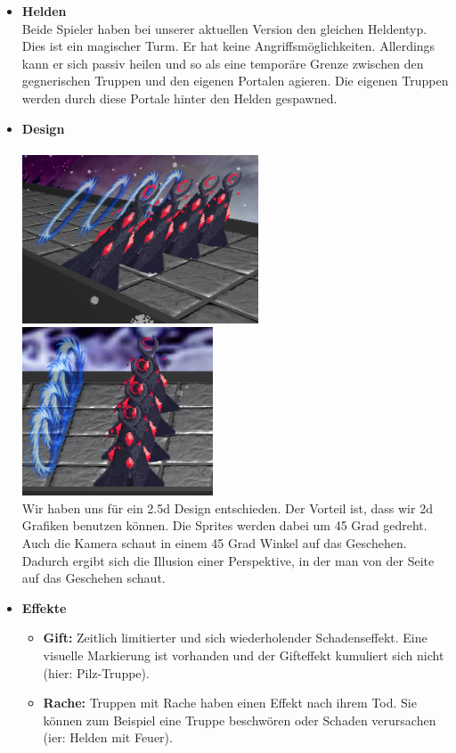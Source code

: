 \begin{itemize}
    \item \textbf{Helden} \\
        Beide Spieler haben bei unserer aktuellen Version den gleichen Heldentyp. Dies ist ein magischer Turm. Er hat keine Angriffsmöglichkeiten. Allerdings kann er sich passiv heilen und so als eine
        temporäre Grenze zwischen den gegnerischen Truppen und den eigenen Portalen agieren. Die eigenen Truppen werden durch diese Portale hinter den Helden gespawned.
    \item \textbf{Design} \\
        \\
        \includegraphics*[height=5cm]{resources/25d.png} \includegraphics*[height=5cm]{resources/25dtwo.png}\\
        Wir haben uns für ein 2.5d Design entschieden. Der Vorteil ist, dass wir 2d Grafiken benutzen können. Die Sprites werden dabei um 45 Grad gedreht. Auch 
        die Kamera schaut in einem 45 Grad Winkel auf das Geschehen. Dadurch ergibt sich die Illusion einer Perspektive, in der man von der Seite auf das Geschehen schaut. 
    \item \textbf{Effekte}
    \begin{itemize}
        \item \textbf{Gift:}
        Zeitlich limitierter und sich wiederholender Schadenseffekt.
        Eine visuelle Markierung ist vorhanden und der Gifteffekt kumuliert sich nicht (hier: Pilz-Truppe).
        \item \textbf{Rache:}
            Truppen mit Rache haben einen Effekt nach ihrem Tod. Sie können zum Beispiel eine Truppe beschwören oder Schaden verursachen (ier: Helden mit Feuer).
    \end{itemize}
\end{itemize}

